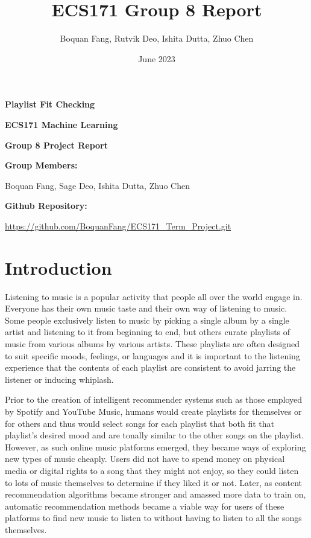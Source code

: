 \documentclass[titlepage]{article}
\title{ECS171 Group 8 Report}
\author{Boquan Fang, Rutvik Deo, Ishita Dutta, Zhuo Chen}
\date{June 2023}
\begin{document}
\begin{titlepage}
    \begin{center}
        \vspace*{6cm}

        \Huge
        \textbf{Playlist Fit Checking}

        \vspace{0.5cm}

        \LARGE
        \textbf{ECS171 Machine Learning}

        \textbf{Group 8 Project Report}

        \vspace{0.5cm}

        \Large
        \textbf{Group Members:}

        Boquan Fang, Sage Deo, Ishita Dutta, Zhuo Chen

        \vspace{0.5cm}

        \textbf{Github Repository:}

        \url{https://github.com/BoquanFang/ECS171_Term_Project.git}

        \vspace*{\fill}
    \end{center}
\end{titlepage}




\section{Introduction}
Listening to music is a popular activity that people all over the world engage in. 
Everyone has their own music taste and their own way of listening to music.
Some people exclusively listen to music by picking a single album by a single artist 
and listening to it from beginning to end, but others curate playlists of music from
various albums by various artists. These playlists are often designed to suit specific
moods, feelings, or languages and it is important to the listening experience that the contents of
each playlist are consistent to avoid jarring the listener or inducing whiplash.

Prior to the creation of intelligent recommender systems such as those employed by 
Spotify and YouTube Music, humans would create playlists for themselves or for others
and thus would select songs for each playlist that both fit that playlist's desired mood
and are tonally similar to the other songs on the playlist. However, as such 
online music platforms emerged, they became ways of exploring new types of music cheaply.
Users did not have to spend money on physical media or digital rights to a song that they
might not enjoy, so they could listen to lots of music themselves to determine if they liked it
or not. Later, as content recommendation algorithms became stronger and amassed more data
to train on, automatic recommendation methods became a viable way for users of these platforms
to find new music to listen to without having to listen to all the songs themselves. 
\end{document}
